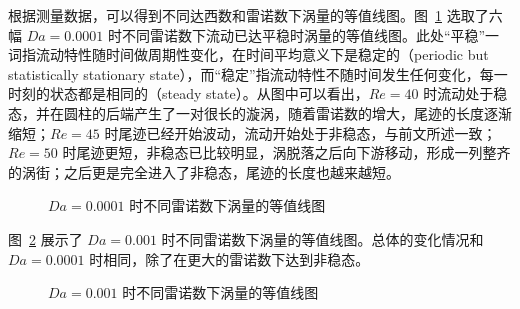 根据测量数据，可以得到不同达西数和雷诺数下涡量的等值线图。图~\ref{fig: vorticity-contour-1e-4} 选取了六幅 $Da=0.0001$ 时不同雷诺数下流动已达平稳时涡量的等值线图。此处“平稳”一词指流动特性随时间做周期性变化，在时间平均意义下是稳定的（periodic but statistically stationary state），而“稳定”指流动特性不随时间发生任何变化，每一时刻的状态都是相同的（steady state）。从图中可以看出，$Re=40$ 时流动处于稳态，并在圆柱的后端产生了一对很长的漩涡，随着雷诺数的增大，尾迹的长度逐渐缩短；$Re=45$ 时尾迹已经开始波动，流动开始处于非稳态，与前文所述一致；$Re=50$ 时尾迹更短，非稳态已比较明显，涡脱落之后向下游移动，形成一列整齐的涡街；之后更是完全进入了非稳态，尾迹的长度也越来越短。

\begin{figure}
	\centering
	\begin{minipage}{\textwidth}
		\centering
	\end{minipage}
	\centering
	\begin{minipage}{\textwidth}
		\centering
	\end{minipage}
	\centering
	\begin{minipage}{\textwidth}
		\centering
	\end{minipage}
	\caption{$Da=0.0001$ 时不同雷诺数下涡量的等值线图}
	\label{fig: vorticity-contour-1e-4}
\end{figure}

图~\ref{fig: vorticity-contour-1e-3} 展示了 $Da=0.001$ 时不同雷诺数下涡量的等值线图。总体的变化情况和 $Da=0.0001$ 时相同，除了在更大的雷诺数下达到非稳态。

\begin{figure}
	\centering
	\begin{minipage}{\textwidth}
		\centering
	\end{minipage}
	\centering
	\begin{minipage}{\textwidth}
		\centering
	\end{minipage}
	\centering
	\begin{minipage}{\textwidth}
		\centering
	\end{minipage}
	\caption{$Da=0.001$ 时不同雷诺数下涡量的等值线图}
	\label{fig: vorticity-contour-1e-3}
\end{figure}

